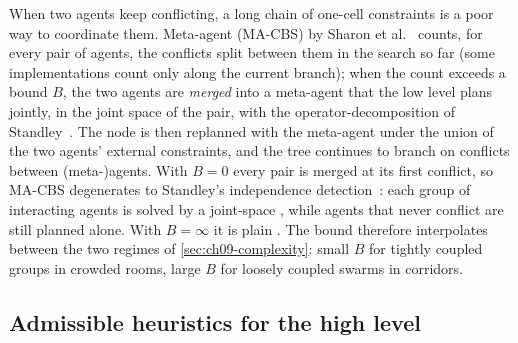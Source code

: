 When two agents keep conflicting, a long chain of one-cell constraints is
a poor way to coordinate them. Meta-agent \cbs (MA-CBS) by Sharon et al.~\cite{sharon2015cbs} counts, for
every pair of agents, the conflicts split between them in the search so far
(some implementations count only along the current branch); when the count
exceeds a bound $B$, the two agents are
\emph{merged} into a meta-agent that the low level plans jointly, in the
joint space of the pair, with the operator-decomposition \astar of
Standley~\cite{standley2010finding}. The node is then replanned with the
meta-agent under the union of the two agents' external constraints, and the
tree continues to branch on conflicts between (meta-)agents. With $B = 0$
every pair is merged at its first conflict, so MA-CBS degenerates to
Standley's independence detection~\cite{standley2010finding}: each group of
interacting agents is solved by a joint-space \astar, while agents that
never conflict are still planned alone. With $B = \infty$ it is plain
\cbs. The bound therefore interpolates between the two
regimes of \cref{sec:ch09-complexity}: small $B$ for tightly coupled
groups in crowded rooms, large $B$ for loosely coupled swarms in corridors.

\subsection{Admissible heuristics for the high level}
\label{sec:ch09-heuristics}

